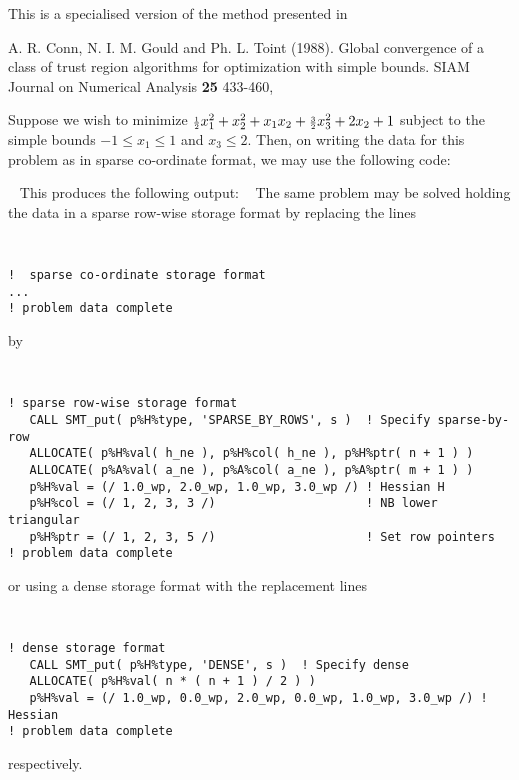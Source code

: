 \documentclass{galahad}
\begin{document}
\vspace*{1mm}

\galreferences
\vspace*{1mm}

\noindent
This is a specialised version of the method presented in 
\vspace*{1mm}

\noindent
A. R. Conn, N. I. M. Gould and Ph. L. Toint (1988).
Global convergence of a class of trust region algorithms
for optimization with simple bounds.
SIAM Journal on Numerical Analysis {\bf 25} 433-460,


\galexample
Suppose we wish to minimize
${\scriptstyle \frac{1}{2}} x_1^2 + x_2^2 + x_1 x_2 + {\scriptstyle \frac{3}{2}} x_3^2 + 2 x_2 + 1$
subject to the simple bounds
$-1  \leq  x_{1}  \leq  1$ and $x_{3}  \leq  2$.
Then, on writing the data for this problem as
in sparse co-ordinate format, we may use the following code:

{\tt \small
\VerbatimInput{\packageexample}
}
\noindent
This produces the following output:
{\tt \small
\VerbatimInput{\packageresults}
}
\noindent
The same problem may be solved holding the data in 
a sparse row-wise storage format by replacing the lines
{\tt \small
\begin{verbatim}
!  sparse co-ordinate storage format
...
! problem data complete   
\end{verbatim}
}
\noindent
by
{\tt \small
\begin{verbatim}
! sparse row-wise storage format
   CALL SMT_put( p%H%type, 'SPARSE_BY_ROWS', s )  ! Specify sparse-by-row
   ALLOCATE( p%H%val( h_ne ), p%H%col( h_ne ), p%H%ptr( n + 1 ) )
   ALLOCATE( p%A%val( a_ne ), p%A%col( a_ne ), p%A%ptr( m + 1 ) )
   p%H%val = (/ 1.0_wp, 2.0_wp, 1.0_wp, 3.0_wp /) ! Hessian H
   p%H%col = (/ 1, 2, 3, 3 /)                     ! NB lower triangular
   p%H%ptr = (/ 1, 2, 3, 5 /)                     ! Set row pointers
! problem data complete   
\end{verbatim}
}
\noindent
or using a dense storage format with the replacement lines
{\tt \small
\begin{verbatim}
! dense storage format
   CALL SMT_put( p%H%type, 'DENSE', s )  ! Specify dense
   ALLOCATE( p%H%val( n * ( n + 1 ) / 2 ) )
   p%H%val = (/ 1.0_wp, 0.0_wp, 2.0_wp, 0.0_wp, 1.0_wp, 3.0_wp /) ! Hessian
! problem data complete   
\end{verbatim}
}
\noindent
respectively.
\end{document}
